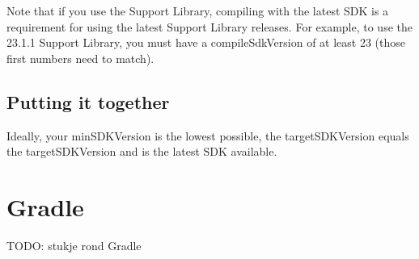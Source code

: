Note that if you use the Support Library, compiling with the latest SDK is a requirement for using the latest Support Library releases. For example, to use the 23.1.1 Support Library, you must have a compileSdkVersion of at least 23 (those first numbers need to match). 

\subsection{Putting it together}
Ideally, your minSDKVersion is the lowest possible, the targetSDKVersion equals the targetSDKVersion and is the latest SDK available.

\section{Gradle}
TODO: stukje rond Gradle

 
